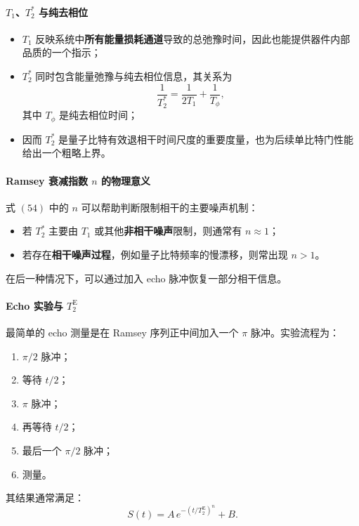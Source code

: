 \documentclass[12pt,a4paper,oneside]{ctexbook}
\begin{document}
\paragraph{\(T_1\)、\(T_2^*\) 与纯去相位}
\begin{itemize}
    \item \(T_1\) 反映系统中\textbf{所有能量损耗通道}导致的总弛豫时间，因此也能提供器件内部品质的一个指示；
    \item \(T_2^*\) 同时包含能量弛豫与纯去相位信息，其关系为
    \[
    \frac{1}{T_2^*}=\frac{1}{2T_1}+\frac{1}{T_\phi},
    \]
    其中 \(T_\phi\) 是纯去相位时间；
    \item 因而 \(T_2^*\) 是量子比特有效退相干时间尺度的重要度量，也为后续单比特门性能给出一个粗略上界。
\end{itemize}

\paragraph{Ramsey 衰减指数 \(n\) 的物理意义}
式 \((54)\) 中的 \(n\) 可以帮助判断限制相干的主要噪声机制：
\begin{itemize}
    \item 若 \(T_2^*\) 主要由 \(T_1\) 或其他\textbf{非相干噪声}限制，则通常有 \(n\approx 1\)；
    \item 若存在\textbf{相干噪声过程}，例如量子比特频率的慢漂移，则常出现 \(n>1\)。
\end{itemize}

在后一种情况下，可以通过加入 echo 脉冲恢复一部分相干信息。

\paragraph{Echo 实验与 \(T_2^{\mathrm{E}}\)}
最简单的 echo 测量是在 Ramsey 序列正中间加入一个 \(\pi\) 脉冲。实验流程为：
\begin{enumerate}
    \item \(\pi/2\) 脉冲；
    \item 等待 \(t/2\)；
    \item \(\pi\) 脉冲；
    \item 再等待 \(t/2\)；
    \item 最后一个 \(\pi/2\) 脉冲；
    \item 测量。
\end{enumerate}

其结果通常满足：
\begin{equation}
S(t)=A\,e^{-(t/T_2^{\mathrm{E}})^n}+B.
\tag{55}
\end{equation}
\end{document}
